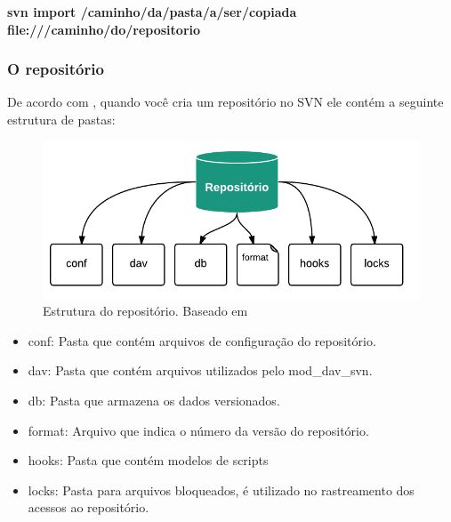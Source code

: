 \begin{centering}

\colorbox{PineGreen}{
\begin{minipage}{450px}
  \textbf{svn import /caminho/da/pasta/a/ser/copiada file:///caminho/do/repositorio}

\end{minipage}
}
\end{centering}


\subsubsection{O repositório}

De acordo com , quando você cria um repositório no SVN ele contém a seguinte estrutura de pastas:

\begin{figure}[!htb]
\centering
\includegraphics[scale=1]{figuras/repositorio.png}
\caption{Estrutura do repositório. Baseado em \cite{svn-book}}
\end{figure}


\begin{itemize}

\item conf: Pasta que contém arquivos de configuração do repositório.

\item dav: Pasta que contém arquivos utilizados pelo mod\_dav\_svn.

\item db: Pasta que armazena os dados versionados.

\item format: Arquivo que indica o número da versão do repositório.

\item hooks: Pasta que contém modelos de scripts

\item locks: Pasta para arquivos bloqueados, é utilizado no rastreamento dos acessos ao repositório.

\end{itemize}


